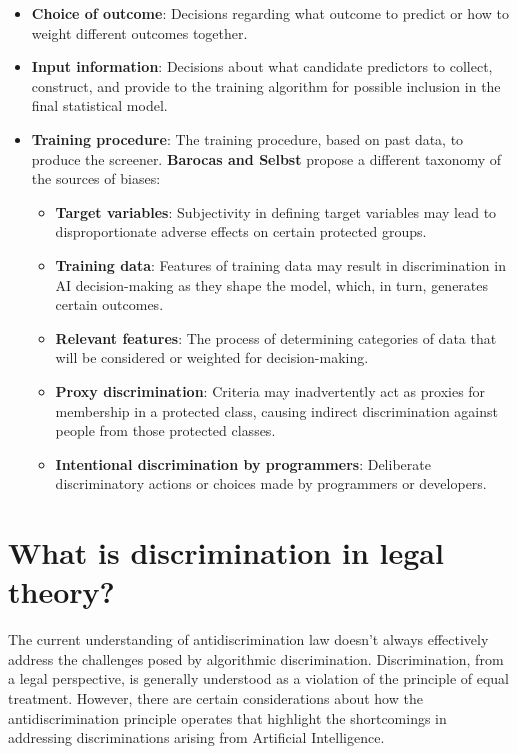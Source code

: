 \begin{itemize}
    \item \textbf{Choice of outcome}: Decisions regarding what outcome to predict or how to weight different outcomes together.
    \item \textbf{Input information}: Decisions about what candidate predictors to collect, construct, and provide to the training algorithm for possible inclusion in the final statistical model.
    \item \textbf{Training procedure}: The training procedure, based on past data, to produce the screener. \newline
    \textbf{Barocas and Selbst} propose a different taxonomy of the sources of biases:
    \begin{itemize}
        \item \textbf{Target variables}: Subjectivity in defining target variables may lead to disproportionate adverse effects on certain protected groups.
        \item \textbf{Training data}: Features of training data may result in discrimination in AI decision-making as they shape the model, which, in turn, generates certain outcomes.
        \item \textbf{Relevant features}: The process of determining categories of data that will be considered or weighted for decision-making.
        \item \textbf{Proxy discrimination}: Criteria may inadvertently act as proxies for membership in a protected class, causing indirect discrimination against people from those protected classes.
        \item \textbf{Intentional discrimination by programmers}: Deliberate discriminatory actions or choices made by programmers or developers.
    \end{itemize}
\end{itemize}

\section{What is discrimination in legal theory?}
The current understanding of antidiscrimination law doesn’t always effectively address the challenges posed by algorithmic discrimination. \newline
Discrimination, from a legal perspective, is generally understood as a violation of the principle of equal treatment. However, there are certain considerations about how the antidiscrimination principle operates that highlight the shortcomings in addressing discriminations arising from Artificial Intelligence.

